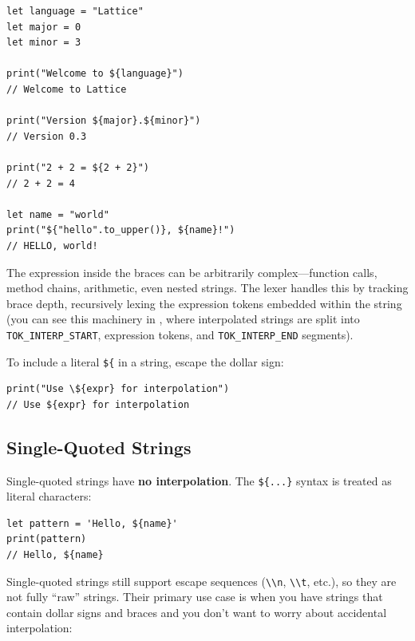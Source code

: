 \begin{lstlisting}[language=Lattice, caption={String interpolation}]
let language = "Lattice"
let major = 0
let minor = 3

print("Welcome to ${language}")
// Welcome to Lattice

print("Version ${major}.${minor}")
// Version 0.3

print("2 + 2 = ${2 + 2}")
// 2 + 2 = 4

let name = "world"
print("${"hello".to_upper()}, ${name}!")
// HELLO, world!
\end{lstlisting}

The expression inside the braces can be arbitrarily complex---function calls, method chains, arithmetic, even nested strings.
The lexer handles this by tracking brace depth, recursively lexing the expression tokens embedded within the string (you can see this machinery in , where interpolated strings are split into \lstinline|TOK_INTERP_START|, expression tokens, and \lstinline|TOK_INTERP_END| segments).

To include a literal \lstinline|${| in a string, escape the dollar sign:

\begin{lstlisting}[language=Lattice, caption={Escaping interpolation}]
print("Use \${expr} for interpolation")
// Use ${expr} for interpolation
\end{lstlisting}

\subsection{Single-Quoted Strings}\label{subsec:single-strings}

Single-quoted strings have \textbf{no interpolation}.
The \lstinline|${...}| syntax is treated as literal characters:

\begin{lstlisting}[language=Lattice, caption={Single-quoted strings: no interpolation}]
let pattern = 'Hello, ${name}'
print(pattern)
// Hello, ${name}
\end{lstlisting}

Single-quoted strings still support escape sequences (\lstinline|\\n|, \lstinline|\\t|, etc.), so they are not fully ``raw'' strings.
Their primary use case is when you have strings that contain dollar signs and braces and you don't want to worry about accidental interpolation:

